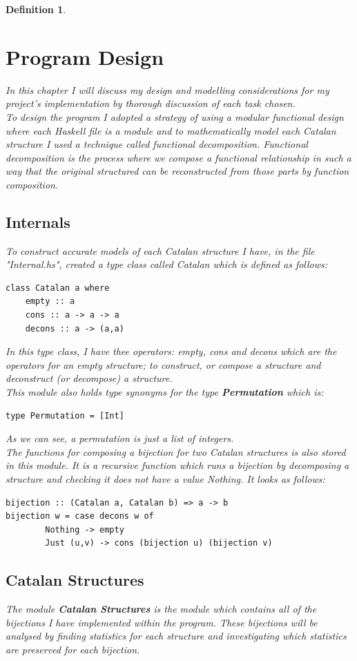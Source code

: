 \documentclass[12pt]{article}
\newtheorem{definition}{Definition}
\begin{document}
\begin{definition}
\section{Program Design}
In this chapter I will discuss my design and modelling considerations for my project's implementation by thorough discussion of each task chosen.\\
To design the program I adopted a strategy of using a modular functional design where each Haskell file is a module and to mathematically model each Catalan structure I used a technique called functional decomposition. Functional decomposition is the process where we compose a functional relationship in such a way that the original structured can be reconstructed from those parts by function composition.
\subsection{Internals}
To construct accurate models of each Catalan structure I have, in the file "Internal.hs", created a type class called Catalan which is defined as follows:
\begin{lstlisting}
class Catalan a where
	empty :: a
	cons :: a -> a -> a
	decons :: a -> (a,a)
\end{lstlisting}
In this type class, I have thee operators: {\it empty}, {\it cons} and {\it decons} which are the operators for an empty structure; to construct, or compose a structure and deconstruct (or decompose) a structure.\\
This module also holds type synonyms for the type {\bf Permutation} which is:
\begin{lstlisting}
type Permutation = [Int]
\end{lstlisting}
As we can see, a permutation is just a list of integers.\\
The functions for composing a bijection for two Catalan structures is also stored in this module. It is a recursive function which runs a bijection by decomposing a structure and checking it does not have a value Nothing. It looks as follows:
\begin{lstlisting}
bijection :: (Catalan a, Catalan b) => a -> b
bijection w = case decons w of
		Nothing -> empty
		Just (u,v) -> cons (bijection u) (bijection v)
\end{lstlisting}

\subsection{Catalan Structures}
The module {\bf Catalan Structures} is the module which contains all of the bijections I have implemented within the program. These bijections will be analysed by finding statistics for each structure and investigating which statistics are preserved for each bijection.

\end{definition}
\end{document}

